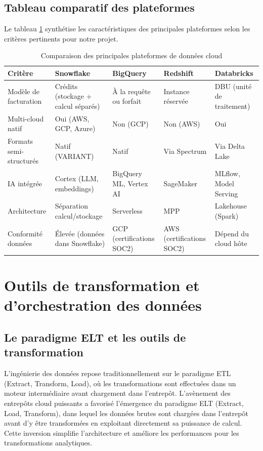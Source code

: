 \subsection{Tableau comparatif des plateformes}

Le tableau \ref{tab:comparatif_dw} synthétise les caractéristiques des principales plateformes selon les critères pertinents pour notre projet.

\begin{table}[h!]
\centering
\begin{tabularx}{\textwidth}{|l|X|X|X|X|}
  \hline
  \textbf{Critère} & \textbf{Snowflake} & \textbf{BigQuery} & \textbf{Redshift} & \textbf{Databricks} \\
  \hline
  Modèle de facturation & Crédits (stockage + calcul séparés) & À la requête ou forfait & Instance réservée & DBU (unité de traitement) \\
  \hline
  Multi-cloud natif & Oui (AWS, GCP, Azure) & Non (GCP) & Non (AWS) & Oui \\
  \hline
  Formats semi-structurés & Natif (VARIANT) & Natif & Via Spectrum & Via Delta Lake \\
  \hline
  IA intégrée & Cortex (LLM, embeddings) & BigQuery ML, Vertex AI & SageMaker & MLflow, Model Serving \\
  \hline
  Architecture & Séparation calcul/stockage & Serverless & MPP & Lakehouse (Spark) \\
  \hline
  Conformité données & Élevée (données dans Snowflake) & GCP (certifications SOC2) & AWS (certifications SOC2) & Dépend du cloud hôte \\
  \hline
\end{tabularx}
\caption{Comparaison des principales plateformes de données cloud}
\label{tab:comparatif_dw}
\end{table}

\section{Outils de transformation et d'orchestration des données}

\subsection{Le paradigme ELT et les outils de transformation}

L'ingénierie des données repose traditionnellement sur le paradigme ETL (Extract, Transform, Load), où les transformations sont effectuées dans un moteur intermédiaire avant chargement dans l'entrepôt. L'avènement des entrepôts cloud puissants a favorisé l'émergence du paradigme ELT (Extract, Load, Transform), dans lequel les données brutes sont chargées dans l'entrepôt avant d'y être transformées en exploitant directement sa puissance de calcul. Cette inversion simplifie l'architecture et améliore les performances pour les transformations analytiques.

